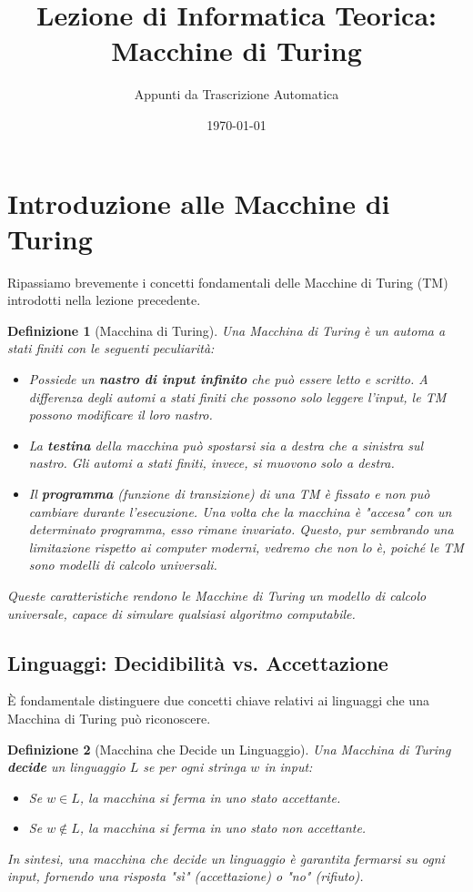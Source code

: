 \documentclass[a4paper]{article}
\title{Lezione di Informatica Teorica: Macchine di Turing}
\author{Appunti da Trascrizione Automatica}
\date{\today}
\newtheorem{definition}{Definizione}
\begin{document}
\maketitle
\tableofcontents
\newpage

\section{Introduzione alle Macchine di Turing}

Ripassiamo brevemente i concetti fondamentali delle Macchine di Turing (TM) introdotti nella lezione precedente.

\begin{definition}[Macchina di Turing]
Una Macchina di Turing è un automa a stati finiti con le seguenti peculiarità:
\begin{itemize}
    \item Possiede un \textbf{nastro di input infinito} che può essere letto e scritto. A differenza degli automi a stati finiti che possono solo leggere l'input, le TM possono modificare il loro nastro.
    \item La \textbf{testina} della macchina può spostarsi sia a destra che a sinistra sul nastro. Gli automi a stati finiti, invece, si muovono solo a destra.
    \item Il \textbf{programma} (funzione di transizione) di una TM è fissato e non può cambiare durante l'esecuzione. Una volta che la macchina è "accesa" con un determinato programma, esso rimane invariato. Questo, pur sembrando una limitazione rispetto ai computer moderni, vedremo che non lo è, poiché le TM sono modelli di calcolo universali.
\end{itemize}
Queste caratteristiche rendono le Macchine di Turing un modello di calcolo universale, capace di simulare qualsiasi algoritmo computabile.
\end{definition}

\subsection{Linguaggi: Decidibilità vs. Accettazione}

È fondamentale distinguere due concetti chiave relativi ai linguaggi che una Macchina di Turing può riconoscere.

\begin{definition}[Macchina che Decide un Linguaggio]
Una Macchina di Turing \textbf{decide} un linguaggio $L$ se per ogni stringa $w$ in input:
\begin{itemize}
    \item Se $w \in L$, la macchina si ferma in uno stato accettante.
    \item Se $w \notin L$, la macchina si ferma in uno stato non accettante.
\end{itemize}
In sintesi, una macchina che decide un linguaggio è garantita fermarsi su ogni input, fornendo una risposta "sì" (accettazione) o "no" (rifiuto).
\end{definition}
\end{document}
